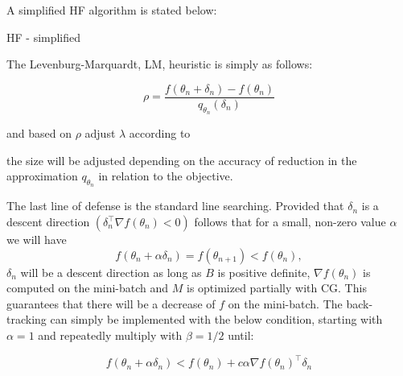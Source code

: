 A simplified HF algorithm is stated below:

\begin{algorithm}
    \caption{HF - simplified}
    \begin{algorithmic}[1]
        \EndFor
    \end{algorithmic}
\end{algorithm}

The Levenburg-Marquardt, LM, heuristic is simply as follows:

\[ \rho = \frac{f(\theta_n + \delta_n) - f(\theta_n)}{q_{\theta_n} (\delta_n)}\]

and based on $\rho$ adjust $\lambda$ according to

\begin{algorithmic}[1]
    \EndIf
    \EndIf
\end{algorithmic}

the size will be adjusted depending on the accuracy of reduction in the approximation $q_{\theta_n}$ in relation to the objective. 

The last line of defense is the standard line searching. Provided that $\delta_n$ is a descent direction $(\delta_n^\top \nabla f(\theta_n) < 0)$ follows that for a small, non-zero value $\alpha$ we will have \[f(\theta_n + \alpha \delta_n) = f(\theta_{n+1}) < f(\theta_n),\] $\delta_n$ will be a descent direction as long as $B$ is positive definite, $\nabla f(\theta_n)$ is computed on the mini-batch and $M$ is optimized partially with CG\cite{Martens2012}. This guarantees that there will be a decrease of $f$ on the mini-batch. The back-tracking can simply be implemented with the below condition, starting with $\alpha = 1$ and repeatedly multiply with $\beta = 1/2$ until:

\[f(\theta_n + \alpha \delta_n) < f(\theta_n) + c \alpha \nabla f(\theta_n)^\top \delta_n\]

